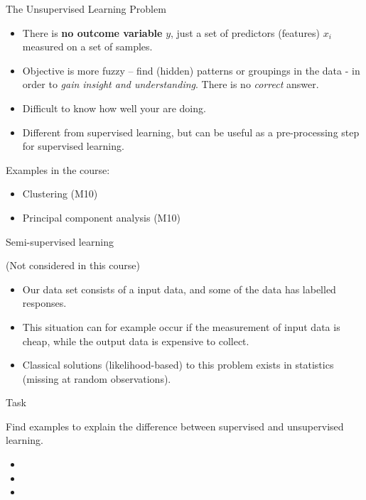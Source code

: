 \documentclass[ignorenonframetext,]{beamer}
\providecommand{\tightlist}{%
  \setlength{\itemsep}{0pt}\setlength{\parskip}{0pt}}
\begin{document}
\begin{frame}{The Unsupervised Learning Problem}

\begin{itemize}
\item
  There is \textbf{no outcome variable} \(y\), just a set of predictors
  (features) \(x_i\) measured on a set of samples.
\item
  Objective is more fuzzy -- find (hidden) patterns or groupings in the
  data - in order to \emph{gain insight and understanding}. There is no
  \emph{correct} answer.
\item
  Difficult to know how well your are doing.
\item
  Different from supervised learning, but can be useful as a
  pre-processing step for supervised learning.
\end{itemize}

Examples in the course:

\begin{itemize}
\tightlist
\item
  Clustering (M10)
\item
  Principal component analysis (M10)
\end{itemize}

\end{frame}

\begin{frame}{Semi-supervised learning}

(Not considered in this course)

\begin{itemize}
\item
  Our data set consists of a input data, and some of the data has
  labelled responses.
\item
  This situation can for example occur if the measurement of input data
  is cheap, while the output data is expensive to collect.
\item
  Classical solutions (likelihood-based) to this problem exists in
  statistics (missing at random observations).
\end{itemize}

\end{frame}

\begin{frame}{Task}

Find examples to explain the difference between supervised and
unsupervised learning.

\begin{itemize}
\item
\item
\item
\end{itemize}

\end{frame}
\end{document}
